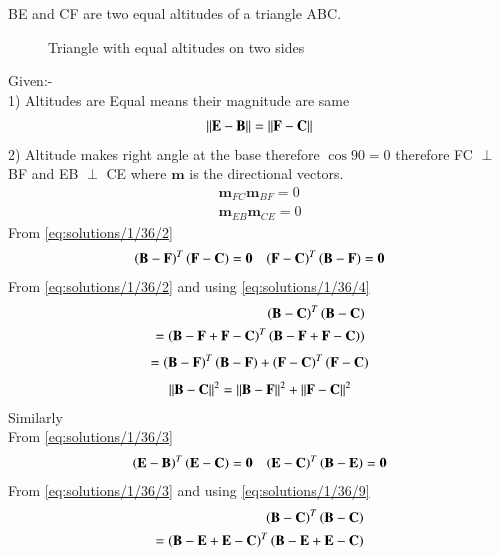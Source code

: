 BE and CF are two equal altitudes of a triangle ABC.
\captionsetup{justification=centering}
\begin{figure}[!h]
\centering
\resizebox{\columnwidth}{!}{}
\caption{Triangle with equal altitudes on two sides}
\label{eq:solutions/1/36/myfig}
\end{figure}
Given:-\\
1) Altitudes are Equal means their magnitude are same
 \begin{align}
 	\left\lVert\mathbf{E} - \mathbf{B}\right\rVert = \left\lVert\mathbf{F} - \mathbf{C}\right\rVert \label{eq:solutions/1/36/1}
 \end{align}
2) Altitude makes right angle at the base therefore $\cos 90 =0$ therefore  FC $\perp$ BF and EB $\perp$ CE where $\textbf{m}$ is the directional vectors.
\begin{align}
\textbf{m}_{FC} \textbf{m}_{BF} = 0 \label{eq:solutions/1/36/2}\\
\textbf{m}_{EB} \textbf{m}_{CE} = 0 \label{eq:solutions/1/36/3}
\end{align}
From \eqref{eq:solutions/1/36/2}
\begin{align}
    \left(\mathbf{B}-\mathbf{F}\right)^T\left(\mathbf{F}-\mathbf{C}\right)=\mathbf{0} && \left(\mathbf{F}-\mathbf{C}\right)^T\left(\mathbf{B}-\mathbf{F}\right)=\mathbf{0}\label{eq:solutions/1/36/4}
\end{align}
From \eqref{eq:solutions/1/36/2} and using \eqref{eq:solutions/1/36/4} 
\begin{align}
    \left(\mathbf{B}-\mathbf{C}\right)^T\left(\mathbf{B}-\mathbf{C}\right)\\
    =\left(\mathbf{B}-\mathbf{F}+\mathbf{F}-\mathbf{C}\right)^T\left(\mathbf{B}-\mathbf{F}+\mathbf{F}-\mathbf{C}\right))
    \end{align}
    \begin{align}
      =\left(\mathbf{B}-\mathbf{F}\right)^T\left(\mathbf{B}-\mathbf{F}\right)+\left(\mathbf{F}-\mathbf{C}\right)^T\left(\mathbf{F}-\mathbf{C}\right) 
    \end{align}
\begin{align}
   \left\lVert\mathbf{B}-\mathbf{C}\right\rVert^2=\left\lVert\mathbf{B}-\mathbf{F}\right\rVert^2+\left\lVert\mathbf{F}-\mathbf{C}\right\rVert^2\label{eq:solutions/1/36/8} 
    \end{align}
    Similarly\\
    From \eqref{eq:solutions/1/36/3}
    \begin{align}
        \left(\mathbf{E}-\mathbf{B}\right)^T\left(\mathbf{E}-\mathbf{C}\right)=\mathbf{0} && \left(\mathbf{E}-\mathbf{C}\right)^T\left(\mathbf{B}-\mathbf{E}\right)=\mathbf{0}\label{eq:solutions/1/36/9}
        \end{align}
From  \eqref{eq:solutions/1/36/3} and using \eqref{eq:solutions/1/36/9}  
\begin{align}
    \left(\mathbf{B}-\mathbf{C}\right)^T\left(\mathbf{B}-\mathbf{C}\right)\\
    =\left(\mathbf{B}-\mathbf{E}+\mathbf{E}-\mathbf{C}\right)^T\left(\mathbf{B}-\mathbf{E}+\mathbf{E}-\mathbf{C}\right)
    \end{align}
